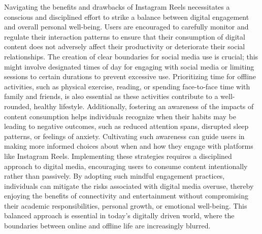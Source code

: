 \documentclass[12pt]{article}
\begin{document}
Navigating the benefits and drawbacks of Instagram Reels necessitates a conscious and disciplined effort to strike a balance between digital engagement and overall personal well-being. Users are encouraged to carefully monitor and regulate their interaction patterns to ensure that their consumption of digital content does not adversely affect their productivity or deteriorate their social relationships. The creation of clear boundaries for social media use is crucial; this might involve designated times of day for engaging with social media or limiting sessions to certain durations to prevent excessive use. Prioritizing time for offline activities, such as physical exercise, reading, or spending face-to-face time with family and friends, is also essential as these activities contribute to a well-rounded, healthy lifestyle. Additionally, fostering an awareness of the impacts of content consumption helps individuals recognize when their habits may be leading to negative outcomes, such as reduced attention spans, disrupted sleep patterns, or feelings of anxiety. Cultivating such awareness can guide users in making more informed choices about when and how they engage with platforms like Instagram Reels. Implementing these strategies requires a disciplined approach to digital media, encouraging users to consume content intentionally rather than passively. By adopting such mindful engagement practices, individuals can mitigate the risks associated with digital media overuse, thereby enjoying the benefits of connectivity and entertainment without compromising their academic responsibilities, personal growth, or emotional well-being. This balanced approach is essential in today's digitally driven world, where the boundaries between online and offline life are increasingly blurred.
\end{document}
